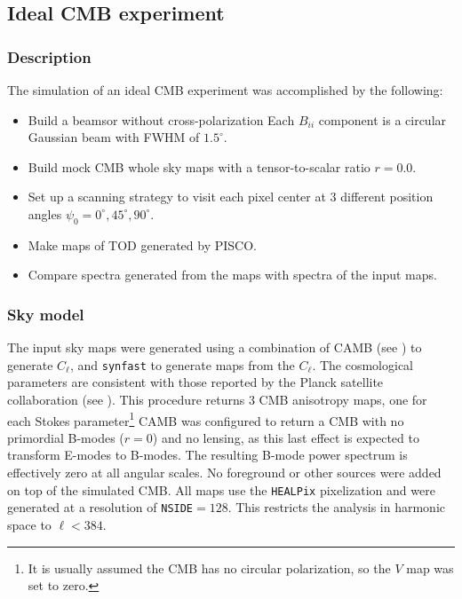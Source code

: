 \documentclass[a4paper,11pt]{article}
\begin{document}
\subsection{Ideal CMB experiment}
\label{sec::ideal_full_sky}

\subsubsection{Description}

The simulation of an ideal CMB experiment was accomplished by the following:

\begin{itemize}
	\item Build a beamsor without cross-polarization Each $B_{ii}$ component is a circular Gaussian beam with FWHM of $1.5^\circ$.
	\item Build mock CMB whole sky maps with a tensor-to-scalar ratio $r=0.0$.
	\item Set up a scanning strategy to visit each pixel center at 3 different position angles $\psi_0 = 0^{\circ},45^{\circ},90^{\circ}$. 
	\item Make maps of TOD generated by PISCO. 
	\item Compare spectra generated from the maps with spectra of the input maps.
\end{itemize}

\subsubsection{Sky model}
\label{subsec::sky_model}

The input sky maps were generated using a combination of CAMB (see \cite{Lewis:2002ah}) to generate $C_\ell$, and \texttt{synfast} to generate maps from the $C_\ell$. The cosmological parameters are consistent with those reported by the Planck satellite collaboration (see \cite{2016A&A...594A..13P}). This procedure returns 3 CMB anisotropy maps, one for each Stokes parameter\footnote{It is usually assumed the CMB has no circular polarization, so the $V$ map was set to zero.} CAMB was configured to return a CMB with no primordial B-modes ($r=0$) and no lensing, as this last effect is expected to transform E-modes to B-modes. The resulting B-mode power spectrum is effectively zero at all angular scales. No foreground or other sources were added on top of the simulated CMB. All maps use the \texttt{HEALPix} pixelization and were generated at a resolution of \texttt{NSIDE}$=128$. This restricts the analysis in harmonic space to $\ell < 384$.
\end{document}
